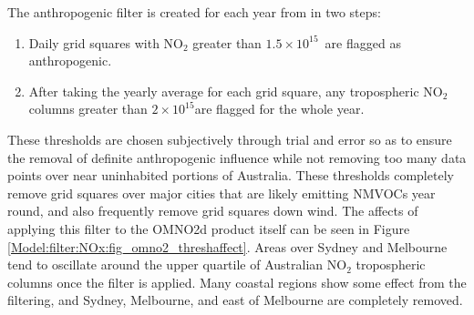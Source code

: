     {\label{Model:filter:NOx:fig_omno2_timeseries}}
    
    The anthropogenic filter is created for each year from in two steps:
    \begin{enumerate}
      \item Daily grid squares with NO$_2$ greater than $1.5\times10^{15}$\moleccm  ~are flagged as anthropogenic.
      \item After taking the yearly average for each grid square, any tropospheric NO$_2$ columns greater than $2 \times 10^{15}$\moleccm are flagged for the whole year.
    \end{enumerate}
    These thresholds are chosen subjectively through trial and error so as to ensure the removal of definite anthropogenic influence while not removing too many data points over near uninhabited portions of Australia.
    These thresholds completely remove grid squares over major cities that are likely emitting NMVOCs year round, and also frequently remove grid squares down wind.
    The affects of applying this filter to the OMNO2d product itself can be seen in Figure \ref{Model:filter:NOx:fig_omno2_threshaffect}.
    Areas over Sydney and Melbourne tend to oscillate around the upper quartile of Australian NO$_2$ tropospheric columns once the filter is applied.
    Many coastal regions show some effect from the filtering, and Sydney, Melbourne, and east of Melbourne are completely removed.
    
    {\label{Model:filter:NOx:fig_omno2_threshaffect}}
    
